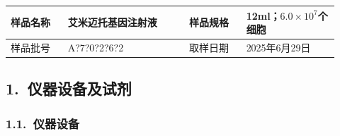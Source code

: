 \documentclass[UTF8,10pt,a4paper,fontset=fandol]{ctexart}
\newcommand{\fieldvalue}[1]{#1}
\newcommand{\handwritten}[1]{#1}
\begin{document}
\begin{tabular}{|p{0.16\linewidth}|p{0.34\linewidth}|p{0.16\linewidth}|p{0.26\linewidth}|}
\hline
样品名称 &
\fieldvalue{艾米迈托基因注射液} &
样品规格 &
\fieldvalue{12ml；$6.0\times10^{7}$个细胞}
\\ \hline
样品批号 &
\fieldvalue{\handwritten{A?7?0?2?6?2}} &
取样日期 &
\fieldvalue{\handwritten{2025年6月29日}}
\\ \hline
\end{tabular}

\subsection{1.\ 仪器设备及试剂}

\subsubsection{1.1.\ 仪器设备}
\end{document}
